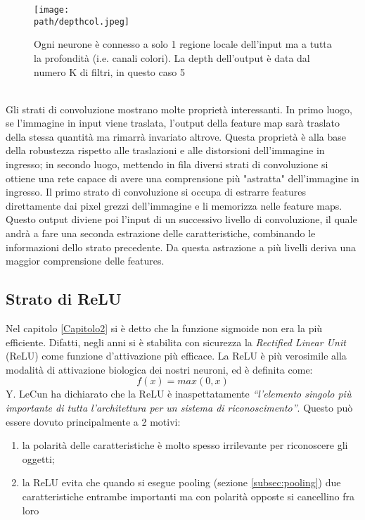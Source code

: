 \begin{figure}[h!]
 \centering
 \texttt{[image: \\path/depthcol.jpeg]} 
 \caption{Ogni neurone è connesso a solo 1 regione locale dell'input ma a tutta la profondità (i.e. canali colori). La depth dell'output è data dal numero K di filtri, in questo caso 5}
 \label{fig:depth}
\end{figure}\\
Gli strati di convoluzione mostrano molte proprietà interessanti.
In primo luogo, se l'immagine in input viene traslata, l'output della feature map sarà traslato della stessa quantità ma rimarrà invariato altrove. Questa proprietà è alla base della robustezza rispetto alle traslazioni e alle distorsioni dell'immagine in ingresso; in secondo luogo, mettendo in fila diversi strati di convoluzione si ottiene una rete capace di avere una comprensione più "astratta" dell'immagine in ingresso. Il primo strato di convoluzione si occupa di estrarre features direttamente dai pixel grezzi dell'immagine e li memorizza nelle feature maps. Questo output diviene poi l'input di un successivo livello di convoluzione, il quale andrà a fare una seconda estrazione delle caratteristiche, combinando le informazioni dello strato precedente. Da questa astrazione a più livelli deriva una maggior comprensione delle features. \\
\subsection{Strato di ReLU}
Nel capitolo \ref{Capitolo2} si è detto che la funzione sigmoide non era la più efficiente. Difatti, negli anni si è stabilita con sicurezza la \emph{Rectified Linear Unit} (ReLU) come funzione d'attivazione più efficace. La ReLU è più verosimile alla modalità di attivazione biologica dei nostri neuroni\parencite{Relu}, ed è definita come: 
$$
f(x) = max(0,x)
$$ 
Y. LeCun ha dichiarato che la ReLU è inaspettatamente \emph{“l'elemento
singolo più importante di tutta l'architettura per un sistema di riconoscimento”}. Questo può essere dovuto principalmente a 2 motivi:
\begin{enumerate}
\item la polarità delle caratteristiche è molto spesso irrilevante per riconoscere gli oggetti;
\item la ReLU evita che quando si esegue pooling (sezione \ref{subsec:pooling}) due caratteristiche entrambe importanti ma con polarità opposte si cancellino fra loro
\end{enumerate}
